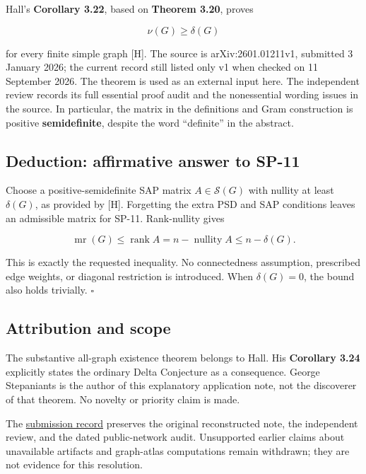 \documentclass[10pt,a4paper]{article}
\begin{document}
Hall's \textbf{Corollary 3.22}, based on \textbf{Theorem 3.20}, proves

\[\nu(G)\ge\delta(G)\]

for every finite simple graph {[}H{]}. The source is arXiv:2601.01211v1,
submitted 3 January 2026; the current record still listed only v1 when
checked on 11 September 2026. The theorem is used as an external input
here. The independent review records its full essential proof audit and
the nonessential wording issues in the source. In particular, the matrix
in the definitions and Gram construction is positive
\textbf{semidefinite}, despite the word ``definite'' in the abstract.

\subsection{Deduction: affirmative answer to
SP-11}\label{deduction-affirmative-answer-to-sp-11}

Choose a positive-semidefinite SAP matrix \(A\in\mathcal S(G)\) with
nullity at least \(\delta(G)\), as provided by {[}H{]}. Forgetting the
extra PSD and SAP conditions leaves an admissible matrix for SP-11.
Rank-nullity gives

\[
\operatorname{mr}(G)\le\operatorname{rank}A
=n-\operatorname{nullity}A\le n-\delta(G).
\]

This is exactly the requested inequality. No connectedness assumption,
prescribed edge weights, or diagonal restriction is introduced. When
\(\delta(G)=0\), the bound also holds trivially. \(\square\)

\subsection{Attribution and scope}\label{attribution-and-scope}

The substantive all-graph existence theorem belongs to Hall. His
\textbf{Corollary 3.24} explicitly states the ordinary Delta Conjecture
as a consequence. George Stepaniants is the author of this explanatory
application note, not the discoverer of that theorem. No novelty or
priority claim is made.

The
\href{https://github.com/ajt60gaibb/OpenProblemsInNLA/blob/main/references/stepaniants-sp11-sp12-2026-09-11/README.md}{submission
record} preserves the original reconstructed note, the independent
review, and the dated public-network audit. Unsupported earlier claims
about unavailable artifacts and graph-atlas computations remain
withdrawn; they are not evidence for this resolution.
\end{document}
